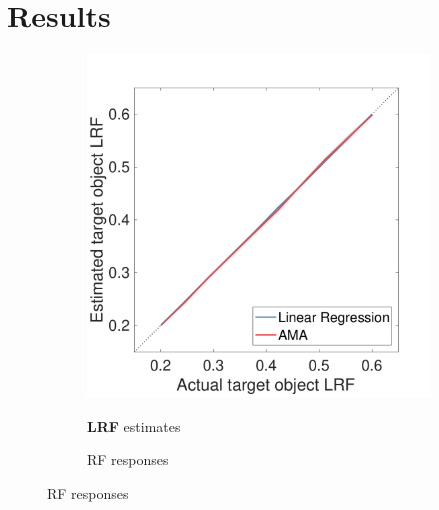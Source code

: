 \documentclass{jov}
\providecommand{\DIFaddtex}[1]{{\bf #1}} %
\providecommand{\DIFdeltex}[1]{} %
\providecommand{\DIFaddend}{} %
\providecommand{\DIFaddFL}[1]{\DIFadd{#1}} %
\providecommand{\DIFdelFL}[1]{\DIFdel{#1}} %
\providecommand{\DIFaddbeginFL}{} %
\providecommand{\DIFaddendFL}{} %
\providecommand{\DIFdelbeginFL}{} %
\providecommand{\DIFdelendFL}{} %
\providecommand{\DIFadd}[1]{\texorpdfstring{\DIFaddtex{#1}}{#1}} %
\providecommand{\DIFdel}[1]{\texorpdfstring{\DIFdeltex{#1}}{}} %
\newcommand{\DIFscaledelfig}{0.5}
\newlength{\DIFdelgraphicswidth} %
\newlength{\DIFdelgraphicsheight} %
\newcommand{\DIFaddincludegraphics}[2][]{{\color{blue}\fbox{\DIFOincludegraphics[#1]{#2}}}} %
\newcommand{\DIFdelincludegraphics}[2][]{%
\sbox{\DIFdelgraphicsbox}{\DIFOincludegraphics[#1]{#2}}%
\settoboxwidth{\DIFdelgraphicswidth}{\DIFdelgraphicsbox} %
\settoboxtotalheight{\DIFdelgraphicsheight}{\DIFdelgraphicsbox} %
\scalebox{\DIFscaledelfig}{%
\parbox[b]{\DIFdelgraphicswidth}{\usebox{\DIFdelgraphicsbox}\\[-\baselineskip] \rule{\DIFdelgraphicswidth}{0em}}\llap{\resizebox{\DIFdelgraphicswidth}{\DIFdelgraphicsheight}{%
\setlength{\unitlength}{\DIFdelgraphicswidth}%
\begin{picture}(1,1)%
\thicklines\linethickness{2pt} %
{\color[rgb]{1,0,0}\put(0,0){\framebox(1,1){}}}%
{\color[rgb]{1,0,0}\put(0,0){\line( 1,1){1}}}%
{\color[rgb]{1,0,0}\put(0,1){\line(1,-1){1}}}%
\end{picture}%
}\hspace*{3pt}}} %
} %
\DeclareRobustCommand{\DIFaddend}{\DIFOaddend \let\includegraphics\DIFOincludegraphics} %
\DeclareRobustCommand{\DIFaddbeginFL}{\DIFOaddbeginFL \let\includegraphics\DIFaddincludegraphics} %
\DeclareRobustCommand{\DIFaddendFL}{\DIFOaddendFL \let\includegraphics\DIFOincludegraphics} %
\DeclareRobustCommand{\DIFdelbeginFL}{\DIFOdelbeginFL \let\includegraphics\DIFdelincludegraphics} %
\DeclareRobustCommand{\DIFdelendFL}{\DIFOaddendFL \let\includegraphics\DIFOincludegraphics} %
\begin{document}
\DIFaddend \section{Results} \label{Results}
\begin{figure}
\centering
            \begin{subfigure}[b]{0.3 \textwidth}
        \caption{\DIFdelbeginFL \DIFdelFL{LRV }\DIFdelendFL \DIFaddbeginFL \DIFaddFL{LRF }\DIFaddendFL estimates}
        \includegraphics[width=\textwidth, trim={0 0 0 1.3cm},clip]{../FiguresDraft5/Figure10/Figure10_a.pdf}
        \label{fig:case1Estimates}
    \end{subfigure} 
        \begin{subfigure}[b]{0.31 \textwidth}
        \caption{RF responses}

\end{subfigure}
\end{figure}
\end{document}
